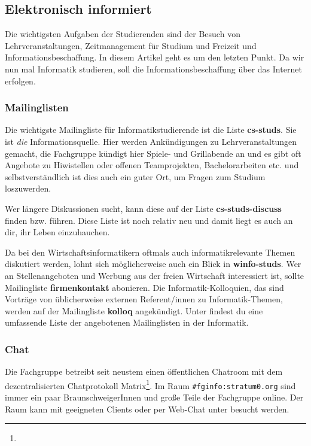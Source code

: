 
\subsection{Elektronisch informiert}
	\label{elekinf}
	Die wichtigsten Aufgaben der Studierenden sind der Besuch von Lehrveranstaltungen, Zeitmanagement für Studium und Freizeit und Informationsbeschaffung. In diesem Artikel geht es um den letzten Punkt. Da wir nun mal Informatik studieren, soll die Informationsbeschaffung über das Internet erfolgen.

	\subsubsection*{Mailinglisten}
	\label{mailinglisten}
		Die wichtigste Mailingliste für Informatikstudierende ist die Liste \textbf{cs-studs}. Sie ist \emph{die} Informationsquelle. Hier werden Ankündigungen zu Lehrveranstaltungen gemacht, die Fachgruppe kündigt hier Spiele- und Grillabende an und es gibt oft Angebote zu Hiwistellen oder offenen Teamprojekten, Bachelorarbeiten etc. und selbstverständlich ist dies auch ein guter Ort, um Fragen zum Studium loszuwerden.

		Wer längere Diskussionen sucht, kann diese auf der Liste \textbf{cs-studs-discuss} finden bzw. führen. Diese Liste ist noch relativ neu und damit liegt es auch an dir, ihr Leben einzuhauchen.

		Da bei den Wirtschaftsinformatikern oftmals auch informatikrelevante Themen diskutiert werden, lohnt sich möglicherweise auch ein Blick in \textbf{winfo-studs}. 
		Wer an Stellenangeboten und Werbung aus der freien
		Wirtschaft interessiert ist, sollte Mailingliste
		\textbf{firmenkontakt} abonieren. Die
		Informatik-Kolloquien, das sind Vorträge von
		üblicherweise externen Referent/innen zu Informatik-Themen,
		werden auf der Mailingliste \textbf{kolloq} angekündigt.
		Unter
		findest du eine umfassende Liste der angebotenen Mailinglisten in der Informatik.

	\subsubsection*{Chat}
		Die Fachgruppe betreibt seit neustem einen öffentlichen Chatroom mit dem dezentralisierten Chatprotokoll Matrix\footnote{}. Im Raum \texttt{\#fginfo:stratum0.org} sind immer ein paar BraunschweigerInnen und große Teile der Fachgruppe online. Der Raum kann mit geeigneten Clients oder per Web-Chat unter  besucht werden.

